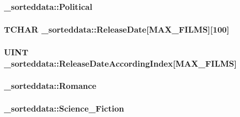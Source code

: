 \subsubsection[{Political}]{ \+\_\+sorteddata\+::\+Political}\label{struct__sorteddata_ad084e4af308585d2bfdc507d5bbd4847}
\hypertarget{struct__sorteddata_ab85283a73e4e2969636d21578ee513b8}{}
\subsubsection[{Release\+Date}]{\setlength{\rightskip}{0pt plus 5cm}T\+C\+H\+A\+R \+\_\+sorteddata\+::\+Release\+Date\mbox{[}{\bf M\+A\+X\+\_\+\+F\+I\+L\+M\+S}\mbox{]}\mbox{[}100\mbox{]}}\label{struct__sorteddata_ab85283a73e4e2969636d21578ee513b8}
\hypertarget{struct__sorteddata_a99040a368be9251b62ee5cdef76dbc05}{}
\subsubsection[{Release\+Date\+According\+Index}]{\setlength{\rightskip}{0pt plus 5cm}U\+I\+N\+T \+\_\+sorteddata\+::\+Release\+Date\+According\+Index\mbox{[}{\bf M\+A\+X\+\_\+\+F\+I\+L\+M\+S}\mbox{]}}\label{struct__sorteddata_a99040a368be9251b62ee5cdef76dbc05}
\hypertarget{struct__sorteddata_a9aed3a731a5ff19623ba2f12765eb910}{}
\subsubsection[{Romance}]{ \+\_\+sorteddata\+::\+Romance}\label{struct__sorteddata_a9aed3a731a5ff19623ba2f12765eb910}
\hypertarget{struct__sorteddata_a5e2b96097d71580a442dfebfa5a92915}{}
\subsubsection[{Science\+\_\+\+Fiction}]{ \+\_\+sorteddata\+::\+Science\+\_\+\+Fiction}\label{struct__sorteddata_a5e2b96097d71580a442dfebfa5a92915}
\hypertarget{struct__sorteddata_a600c43525ba034fd980a24b3a3c85fcd}{}
